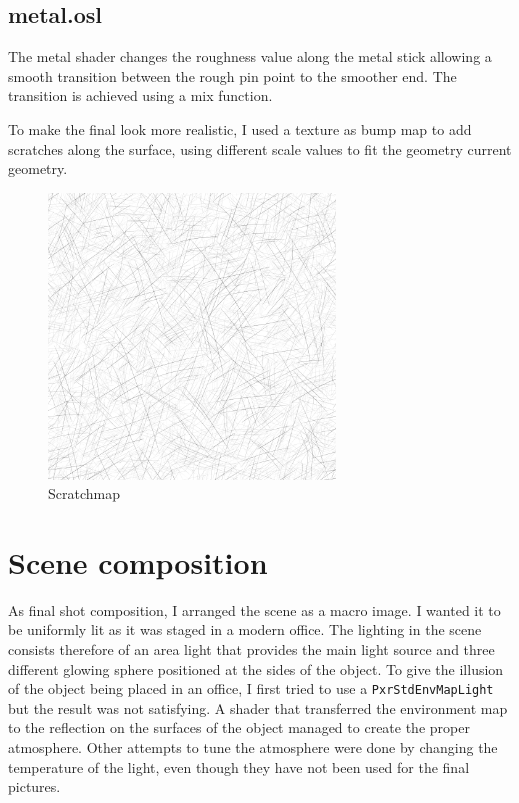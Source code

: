 \documentclass[tog]{acmsiggraph}
\begin{document}
\vspace{1.0cm}
\subsection{metal.osl}

The metal shader changes the roughness value along the metal stick allowing a smooth transition between the rough pin point to the smoother end. The transition is achieved using a mix function.

To make the final look more realistic, I used a texture as bump map to add scratches along the surface, using different scale values to fit the geometry current geometry.

\begin{figure}[ht]
  \centering
  \includegraphics[width=3.0in]{images/scratchmap}
  \caption{Scratchmap}
  \label{fig:scratches}
\end{figure}

\section{Scene composition}

As final shot composition, I arranged the scene as a macro image. I wanted it to be uniformly lit as it was staged in a modern office. The lighting in the scene consists therefore of an area light that provides the main light source and three different glowing sphere positioned at the sides of the object. To give the illusion of the object being placed in an office, I first tried to use a \texttt{PxrStdEnvMapLight} but the result was not satisfying. A shader that transferred the environment map to the reflection on the surfaces of the object managed to create the proper atmosphere. Other attempts to tune the atmosphere were done by changing the temperature of the light, even though they have not been used for the final pictures.
\end{document}
